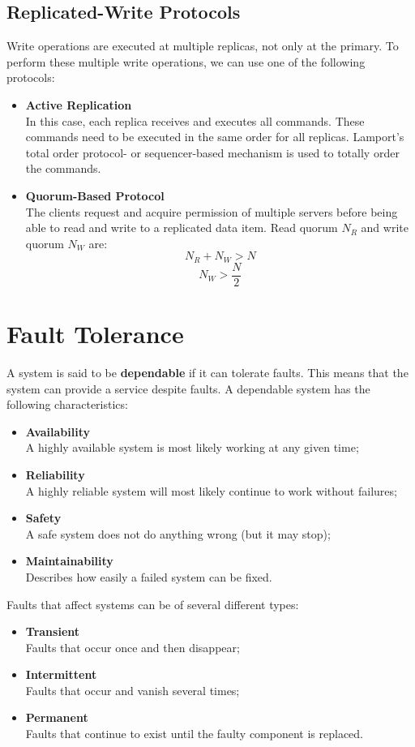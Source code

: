 \documentclass{article}
\begin{document}
\subsection{Replicated-Write Protocols}
Write operations are executed at multiple replicas, not only at the primary. To perform these multiple write operations, we can use one of the following protocols:
\begin{itemize}
	\item \textbf{Active Replication} \\
	In this case, each replica receives and executes all commands. These commands need to be executed in the same order for all replicas. Lamport's total order protocol- or sequencer-based mechanism is used to totally order the commands.
	\item \textbf{Quorum-Based Protocol} \\
	The clients request and acquire permission of multiple servers before being able to read and write to a replicated data item. Read quorum $N_R$ and write quorum $N_W$ are:
	\[ N_R + N_W > N \]
	\[ N_W > \frac{N}{2} \]
\end{itemize}

\section{Fault Tolerance}
A system is said to be \textbf{dependable} if it can tolerate faults. This means that the system can provide a service despite faults. A dependable system has the following characteristics:
\begin{itemize}
	\item \textbf{Availability} \\
	A highly available system is most likely working at any given time;
	\item \textbf{Reliability} \\
	A highly reliable system will most likely continue to work without failures;
	\item \textbf{Safety} \\
	A safe system does not do anything wrong (but it may stop);
	\item \textbf{Maintainability} \\
	Describes how easily a failed system can be fixed.
\end{itemize}
Faults that affect systems can be of several different types:
\begin{itemize}
	\item \textbf{Transient} \\
	Faults that occur once and then disappear;
	\item \textbf{Intermittent} \\
	Faults that occur and vanish several times;
	\item \textbf{Permanent} \\
	Faults that continue to exist until the faulty component is replaced.
\end{itemize}
\end{document}
